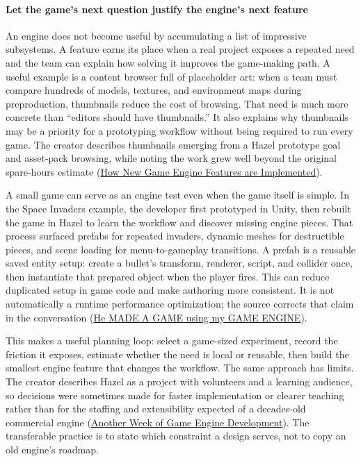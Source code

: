 \paragraph{Let the game's next question justify the engine's next feature}\label{let-the-games-next-question-justify-the-engines-next-feature}

An engine does not become useful by accumulating a list of impressive subsystems. A feature earns its place when a real project exposes a repeated need and the team can explain how solving it improves the game-making path. A useful example is a content browser full of placeholder art: when a team must compare hundreds of models, textures, and environment maps during preproduction, thumbnails reduce the cost of browsing. That need is much more concrete than ``editors should have thumbnails.'' It also explains why thumbnails may be a priority for a prototyping workflow without being required to run every game. The creator describes thumbnails emerging from a Hazel prototype goal and asset-pack browsing, while noting the work grew well beyond the original spare-hours estimate (\href{https://www.youtube.com/watch?v=z1O6AZWuWm4&t=8m54s}{How New Game Engine Features are Implemented}).

A small game can serve as an engine test even when the game itself is simple. In the Space Invaders example, the developer first prototyped in Unity, then rebuilt the game in Hazel to learn the workflow and discover missing engine pieces. That process surfaced prefabs for repeated invaders, dynamic meshes for destructible pieces, and scene loading for menu-to-gameplay transitions. A prefab is a reusable saved entity setup: create a bullet's transform, renderer, script, and collider once, then instantiate that prepared object when the player fires. This can reduce duplicated setup in game code and make authoring more consistent. It is not automatically a runtime performance optimization; the source corrects that claim in the conversation (\href{https://www.youtube.com/watch?v=56ISmbJE9S4&t=2m10s}{He MADE A GAME using my GAME ENGINE}).

This makes a useful planning loop: select a game-sized experiment, record the friction it exposes, estimate whether the need is local or reusable, then build the smallest engine feature that changes the workflow. The same approach has limits. The creator describes Hazel as a project with volunteers and a learning audience, so decisions were sometimes made for faster implementation or clearer teaching rather than for the staffing and extensibility expected of a decades-old commercial engine (\href{https://www.youtube.com/watch?v=Dr6ly-PO9nM&t=1m45s}{Another Week of Game Engine Development}). The transferable practice is to state which constraint a design serves, not to copy an old engine's roadmap.


